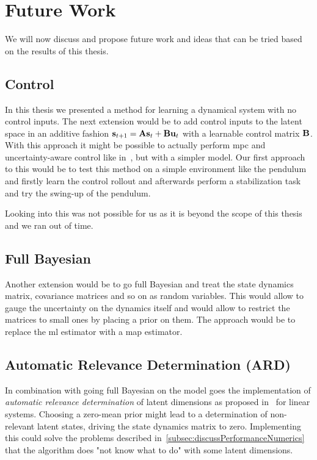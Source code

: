 
\section{Future Work}
	\label{sec:futureWork}

	We will now discuss and propose future work and ideas that can be tried based on the results of this thesis.

	\subsection{Control}
		In this thesis we presented a method for learning a dynamical system with no control inputs. The next extension would be to add control inputs to the latent space in an additive fashion \( \boldsymbol{\mathrm{s}}_{t + 1} = \boldsymbol{\mathrm{A}} \boldsymbol{\mathrm{s}}_t + \boldsymbol{\mathrm{B}} \boldsymbol{\mathrm{u}}_t \) with a learnable control matrix \(\boldsymbol{\mathrm{B}}\). With this approach it might be possible to actually perform \ac{mpc} and uncertainty-aware control like in~\cite{mortonDeepVariationalKoopman2019a}, but with a simpler model. Our first approach to this would be to test this method on a simple environment like the pendulum and firstly learn the control rollout and afterwards perform a stabilization task and try the swing-up of the pendulum.

		Looking into this was not possible for us as it is beyond the scope of this thesis and we ran out of time.

	\subsection{Full Bayesian}
		Another extension would be to go full Bayesian and treat \eg the state dynamics matrix, covariance matrices and so on as random variables. This would allow to gauge the uncertainty on the dynamics itself and would allow to restrict the matrices to small ones by placing a prior on them. The approach would be to replace the \ac{ml} estimator with a \ac{map} estimator.

	\subsection{Automatic Relevance Determination (ARD)}
		In combination with going full Bayesian on the model goes the implementation of \emph{automatic relevance determination} of latent dimensions as proposed in~\cite{bealVariationalKalmanSmoother2000} for linear systems. Choosing a zero-mean prior might lead to a determination of non-relevant latent states, driving the state dynamics matrix to zero. Implementing this could solve the problems described in~\autoref{subsec:discussPerformanceNumerics} that the algorithm does "not know what to do" with some latent dimensions.


